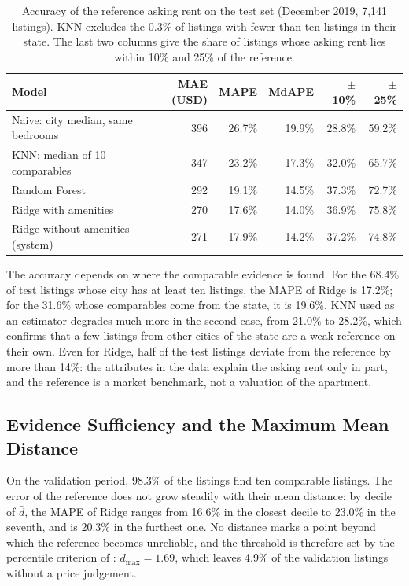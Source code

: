\documentclass[12pt,a4paper]{report}
\begin{document}
\begin{table}[H]
\centering
\caption{Accuracy of the reference asking rent on the test set (December
2019, 7,141 listings). KNN excludes the 0.3\% of listings with fewer than ten
listings in their state. The last two columns give the share of listings
whose asking rent lies within 10\% and 25\% of the reference.}
\label{tab:test-comparison}
\small
\begin{tabularx}{\textwidth}{X r r r r r}
\toprule
\textbf{Model} & \textbf{MAE (USD)} & \textbf{MAPE} & \textbf{MdAPE} &
\textbf{$\pm$10\%} & \textbf{$\pm$25\%}\\
\midrule
Naive: city median, same bedrooms & 396 & 26.7\% & 19.9\% & 28.8\% & 59.2\%\\
KNN: median of 10 comparables & 347 & 23.2\% & 17.3\% & 32.0\% & 65.7\%\\
Random Forest & 292 & 19.1\% & 14.5\% & 37.3\% & 72.7\%\\
Ridge with amenities & 270 & 17.6\% & 14.0\% & 36.9\% & 75.8\%\\
Ridge without amenities (system) & 271 & 17.9\% & 14.2\% & 37.2\% & 74.8\%\\
\bottomrule
\end{tabularx}
\end{table}

The accuracy depends on where the comparable evidence is found. For the
68.4\% of test listings whose city has at least ten listings, the MAPE of
Ridge is 17.2\%; for the 31.6\% whose comparables come from the state, it is
19.6\%. KNN used as an estimator degrades much more in the second case, from
21.0\% to 28.2\%, which confirms that a few listings from other cities of the
state are a weak reference on their own. Even for Ridge, half of the test
listings deviate from the reference by more than 14\%: the attributes in the
data explain the asking rent only in part, and the reference is a market
benchmark, not a valuation of the apartment.

\subsection{Evidence Sufficiency and the Maximum Mean Distance}
\label{sec:results-evidence}

On the validation period, 98.3\% of the listings find ten comparable
listings. The error of the reference does not grow steadily with their mean
distance: by decile of $\bar{d}$, the MAPE of Ridge ranges from 16.6\% in the
closest decile to 23.0\% in the seventh, and is 20.3\% in the furthest one.
No distance marks a point beyond which the reference becomes unreliable, and
the threshold is therefore set by the percentile criterion of
: $d_{\max} = 1.69$, which leaves 4.9\% of
the validation listings without a price judgement.
\end{document}
